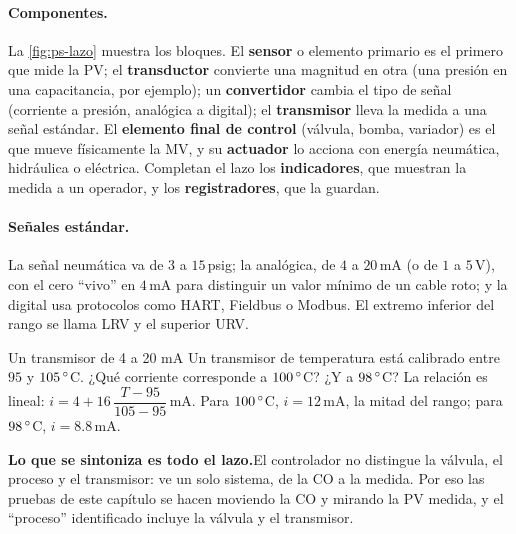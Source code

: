 \paragraph{Componentes.} La \cref{fig:ps-lazo} muestra los bloques. El \textbf{sensor} o elemento primario es el primero que mide la PV; el \textbf{transductor} convierte una magnitud en otra (una presión en una capacitancia, por ejemplo); un \textbf{convertidor} cambia el tipo de señal (corriente a presión, analógica a digital); el \textbf{transmisor} lleva la medida a una señal estándar. El \textbf{elemento final de control} (válvula, bomba, variador) es el que mueve físicamente la MV, y su \textbf{actuador} lo acciona con energía neumática, hidráulica o eléctrica. Completan el lazo los \textbf{indicadores}, que muestran la medida a un operador, y los \textbf{registradores}, que la guardan.

\paragraph{Señales estándar.} La señal neumática va de $3$ a $15$\,psig; la analógica, de $4$ a $20$\,mA (o de $1$ a $5$\,V), con el cero ``vivo'' en $4$\,mA para distinguir un valor mínimo de un cable roto; y la digital usa protocolos como HART, Fieldbus o Modbus. El extremo inferior del rango se llama LRV y el superior URV.

\begin{ejemplo}[label=ej:ps-4a20]{Un transmisor de 4 a 20 mA}
Un transmisor de temperatura está calibrado entre $95$ y $105\,^{\circ}$C. ¿Qué corriente corresponde a $100\,^{\circ}$C? ¿Y a $98\,^{\circ}$C?
\solucion La relación es lineal: $i=4+16\,\dfrac{T-95}{105-95}$\,mA. Para $100\,^{\circ}$C, $i=12$\,mA, la mitad del rango; para $98\,^{\circ}$C, $i=8.8$\,mA.
\end{ejemplo}

\begin{ideaclave}
\textbf{Lo que se sintoniza es todo el lazo.}\enspace El controlador no distingue la válvula, el proceso y el transmisor: ve un solo sistema, de la CO a la medida. Por eso las pruebas de este capítulo se hacen moviendo la CO y mirando la PV medida, y el ``proceso'' identificado incluye la válvula y el transmisor.
\end{ideaclave}
